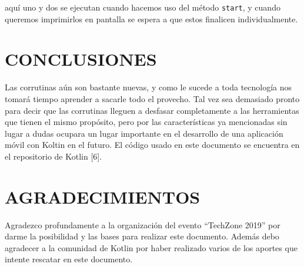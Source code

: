 \documentclass[twocolumn,10pt,abstract=on]{asme2ej}
\begin{document}
aquí uno y dos se ejecutan cuando hacemos uso del método \verb+start+, y cuando queremos imprimirlos en pantalla se espera a que estos finalicen individualmente.


\section{CONCLUSIONES}
Las corrutinas aún son bastante nuevas, y como le sucede a toda tecnología nos tomará tiempo aprender a sacarle todo el provecho.
\smallbreak
Tal vez sea demasiado pronto para decir que las corrutinas lleguen a desfasar completamente a las herramientas que tienen el mismo propósito, pero por las características ya mencionadas sin lugar a dudas ocupara un lugar importante en el desarrollo de una aplicación móvil con Koltin en el futuro.
\smallbreak
El código usado en este documento se encuentra en el repositorio de Kotlin [6].




\section{AGRADECIMIENTOS}
Agradezco profundamente a la organización del evento “TechZone 2019” por darme la posibilidad y las bases para realizar este documento. Además debo agradecer a la comunidad de Kotlin por haber realizado varios de los aportes que intente rescatar en este documento.


%




\end{document}
